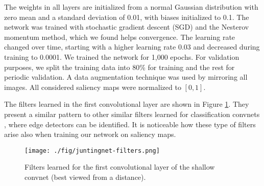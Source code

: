 \documentclass[10pt,twocolumn,letterpaper]{article}
\begin{document}
The weights in all layers are initialized from a normal Gaussian distribution with zero mean and a standard deviation of 0.01, with biases initialized to 0.1.
The network was trained with stochastic gradient descent (SGD) and the Nesterov momentum method, which we found helps convergence. 
The learning rate changed over time, starting with a higher learning rate 0.03 and decreased during training to 0.0001. 
We trained the network for 1,000 epochs.
For validation purposes, we split the training data into 80\% for training and the rest for periodic validation. 
A data augmentation technique was used by mirroring all images. All considered saliency maps were normalized to $[0,1]$.

The filters learned in the first convolutional layer are shown in Figure \ref{fig:juntingnet-filters}.
They present a similar pattern to other similar filters learned for classification convnets \cite{zeiler2014visualizing, zeiler2014visualizing}, where edge detectors can be identified.
It is noticeable how these type of filters arise also when training our network on saliency maps.

\begin{figure}
  \centering
  \texttt{[image: ./fig/juntingnet-filters.png]}
  \caption{Filters learned for the first convolutional layer of the shallow convnet (best viewed from a distance).}
  \label{fig:juntingnet-filters}
\end{figure}%
\end{document}
